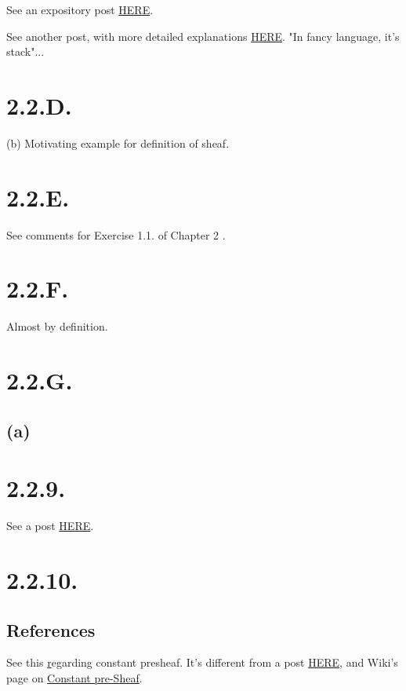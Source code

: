 See an expository post \href{https://math.stackexchange.com/questions/4156317/sheaf-axioms-and-limits-intuition}{HERE}.

See another post, with more detailed explanations \href{https://math.stackexchange.com/questions/455706/gluing-sheaves-can-we-realize-mathcalfw-as-some-kind-of-limit}{HERE}. "In fancy language, it's stack"...

\section{2.2.D.}\label{2.2.D.}

(b) Motivating example for definition of sheaf.

\section{2.2.E.}

See comments for Exercise 1.1. of Chapter 2 \cite{hartshorne2013algebraic}.

\section{2.2.F.}

Almost by definition.

\section{2.2.G.}

\subsection{(a)}



\section{2.2.9.}

See a post \href{https://math.stackexchange.com/questions/385591/question-on-sheafification-of-a-presheaf}{HERE}.

\section{2.2.10.}


\subsection{References}
See this \href{POST} regarding constant presheaf. 
It's different from a post \href{https://math.stackexchange.com/questions/195363/constant-presheaf-not-necessarily-a-sheaf-proof}{HERE}, and Wiki's page on \href{https://en.wikipedia.org/wiki/Constant_sheaf}{Constant pre-Sheaf}. \\\\

